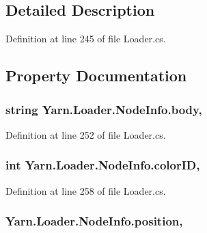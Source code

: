 \subsection{Detailed Description}


Definition at line 245 of file Loader.\-cs.



\subsection{Property Documentation}
\hypertarget{a00133_a18a8b97f2173fbcf8f3077582cc6e96e}{
\subsubsection[{body}]{\setlength{\rightskip}{0pt plus 5cm}string Yarn.\-Loader.\-Node\-Info.\-body\hspace{0.3cm}{\ttfamily [get]}, {\ttfamily [set]}}}\label{a00133_a18a8b97f2173fbcf8f3077582cc6e96e}


Definition at line 252 of file Loader.\-cs.

\hypertarget{a00133_a65f686e0170a9c50b97c4e4eedd1a093}{
\subsubsection[{color\-I\-D}]{\setlength{\rightskip}{0pt plus 5cm}int Yarn.\-Loader.\-Node\-Info.\-color\-I\-D\hspace{0.3cm}{\ttfamily [get]}, {\ttfamily [set]}}}\label{a00133_a65f686e0170a9c50b97c4e4eedd1a093}


Definition at line 258 of file Loader.\-cs.

\hypertarget{a00133_ac368ed021558af21c4abed88042c1aa8}{
\subsubsection[{position}]{ Yarn.\-Loader.\-Node\-Info.\-position\hspace{0.3cm}{\ttfamily [get]}, {\ttfamily [set]}}}\label{a00133_ac368ed021558af21c4abed88042c1aa8}


